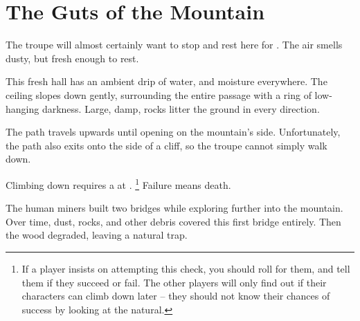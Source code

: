 \section{The Guts of the Mountain}

\begin{multicols}{2}

\renewcommand\npcsymbol{\glsentrysymbol{yonder}}

The troupe will almost certainly want to stop and rest here for .
The air smells dusty, but fresh enough to rest.

\begin{boxtext}
  This fresh hall has an ambient drip of water, and moisture everywhere.
  The ceiling slopes down gently, surrounding the entire passage with a ring of low-hanging darkness.
  Large, damp, rocks litter the ground in every direction.
\end{boxtext}






The path travels upwards until opening on the mountain's side.
Unfortunately, the path also exits onto the side of a cliff, so the troupe cannot simply walk down.

Climbing down requires a  at \tn[14].%
\footnote{If a player insists on attempting this check, you should roll for them, and tell them if they succeed or fail.  The other players will only find out if their characters can climb down later -- they should not know their chances of success by looking at the \gls{natural}.}
Failure means death.


\playCommentaryAftermath[t]


\begin{exampletext}
  The human miners built two bridges while exploring further into the mountain.
  Over time, dust, rocks, and other debris covered this first bridge entirely.
  Then the wood degraded, leaving a natural trap.


\end{exampletext}
\end{multicols}
